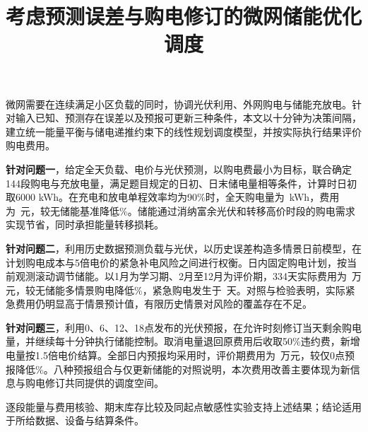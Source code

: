\documentclass[withoutpreface,notoc,bwprint]{cumcmthesis}
\title{考虑预测误差与购电修订的微网储能优化调度}
\renewenvironment{abstract}{%
  \begin{center}{\zihao{3}\bfseries\abstractname}\end{center}%
  \zihao{-4}\songti\setlength{\parindent}{2em}%
}{\par}
\begin{document}
\maketitle
\begin{abstract}
微网需要在连续满足小区负载的同时，协调光伏利用、外网购电与储能充放电。针对输入已知、预测存在误差以及预报可更新三种条件，本文以十分钟为决策间隔，建立统一能量平衡与储电递推约束下的线性规划调度模型，并按实际执行结果评价购电费用。

\textbf{针对问题一}，给定全天负载、电价与光伏预测，以购电费最小为目标，联合确定144段购电与充放电量，满足题目规定的日初、日末储电量相等条件，计算时日初取6000 kWh。在充电和放电单程效率均为90\%时，全天购电量为\QoneGrid\ kWh，费用为\QoneCost\ 元，较无储能基准降低\SavingPercent\%。储能通过消纳富余光伏和转移高价时段的购电需求实现节省，同时承担能量转移损耗。

\textbf{针对问题二}，利用历史数据预测负载与光伏，以历史误差构造多情景日前模型，在计划购电成本与5倍电价的紧急补电风险之间进行权衡。日内固定购电计划，按当前观测滚动调节储能。以1月为学习期、2月至12月为评价期，334天实际费用为\QtwoCost\ 万元，较无储能多情景购电降低\QtwoNoStorageSaving\%，紧急购电发生于\QtwoDays\ 天。对照与检验表明，实际紧急费用仍明显高于情景预计值，有限历史情景对风险的覆盖存在不足。

\textbf{针对问题三}，利用0、6、12、18点发布的光伏预报，在允许时刻修订当天剩余购电量，并继续每十分钟执行储能控制。取消电量退回原费用后收取50\%违约费，新增电量按1.5倍电价结算。全部日内预报均采用时，评价期费用为\QthreeCost\ 万元，较仅0点预报降低\QthreeSaving\%。八种预报组合与仅更新储能的对照说明，本次费用改善主要体现为新信息与购电修订共同提供的调度空间。

逐段能量与费用核验、期末库存比较及同起点敏感性实验支持上述结果；结论适用于所给数据、设备与结算条件。
\end{abstract}


\FloatBarrier

\FloatBarrier

\FloatBarrier



\end{document}

